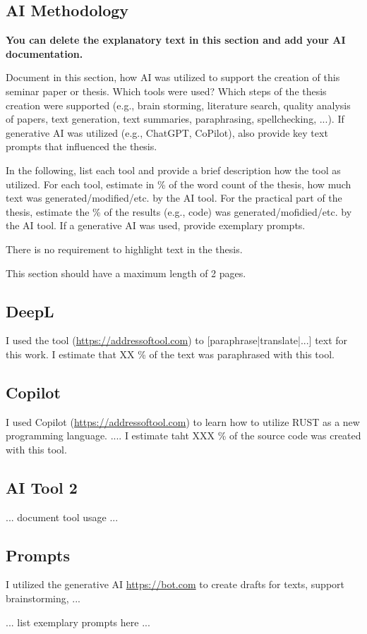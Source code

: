 \begin{appendices}


\section{AI Methodology}

\textbf{You can delete the explanatory text in this section and add your AI documentation.}

Document in this section, how AI was utilized to support the creation of this seminar paper or thesis. Which tools were used? Which steps of the thesis creation were supported (e.g., brain storming, literature search, quality analysis of papers, text generation, text summaries, paraphrasing, spellchecking, ...). If generative AI was utilized (e.g., ChatGPT, CoPilot), also provide key text prompts that influenced the thesis.

In the following, list each tool and provide a brief description how the tool as utilized. For each tool, estimate in \% of the word count of the thesis, how much text was generated/modified/etc. by the AI tool. For the practical part of the thesis, estimate the \% of the results (e.g., code) was generated/mofidied/etc. by the AI tool. If a generative AI was used, provide exemplary prompts.

There is no requirement to highlight text in the thesis.

This section should have a maximum length of 2 pages.

\subsection{DeepL} %
I used the tool (\url{https://addressoftool.com}) to [paraphrase|translate|...] text for this work.  I estimate that XX \% of the text was paraphrased with this tool.

\subsection{Copilot}
I used Copilot (\url{https://addressoftool.com}) to learn how to utilize RUST as a new programming language. ....
I estimate taht XXX \% of the source code was created with this tool.

\subsection{AI Tool 2}
... document tool usage ...

\subsection{Prompts}
I utilized the generative AI \url{https://bot.com} to create drafts for texts, support brainstorming, ...

... list exemplary prompts here ...


\end{appendices}
